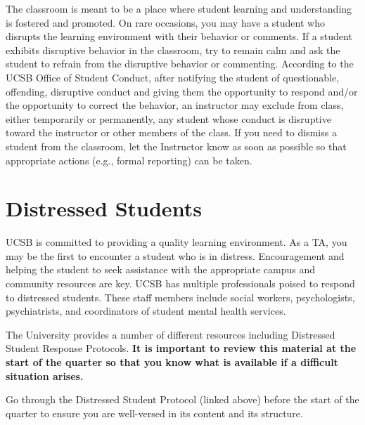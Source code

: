 \documentclass[
  letterpaper,
  DIV=11,
  numbers=noendperiod]{scrreprt}
\begin{document}
The classroom is meant to be a place where student learning and
understanding is fostered and promoted. On rare occasions, you may have
a student who disrupts the learning environment with their behavior or
comments. If a student exhibits disruptive behavior in the classroom,
try to remain calm and ask the student to refrain from the disruptive
behavior or commenting. According to the UCSB Office of Student Conduct,
after notifying the student of questionable, offending, disruptive
conduct and giving them the opportunity to respond and/or the
opportunity to correct the behavior, an instructor may exclude from
class, either temporarily or permanently, any student whose conduct is
disruptive toward the instructor or other members of the class. If you
need to dismiss a student from the classroom, let the Instructor know as
soon as possible so that appropriate actions (e.g., formal reporting)
can be taken.

\hypertarget{distressed-students}{%
\section{Distressed Students}\label{distressed-students}}

UCSB is committed to providing a quality learning environment. As a TA,
you may be the first to encounter a student who is in distress.
Encouragement and helping the student to seek assistance with the
appropriate campus and community resources are key. UCSB has multiple
professionals poised to respond to distressed students. These staff
members include social workers, psychologists, psychiatrists, and
coordinators of student mental health services.

The University provides a number of different resources including
Distressed Student Response Protocols. \textbf{It is important to review
this material at the start of the quarter so that you know what is
available if a difficult situation arises.}

\begin{tcolorbox}[enhanced jigsaw, leftrule=.75mm, toprule=.15mm, arc=.35mm, title=\textcolor{quarto-callout-important-color}{\faExclamation}\hspace{0.5em}{Important}, coltitle=black, breakable, titlerule=0mm, opacitybacktitle=0.6, colback=white, toptitle=1mm, opacityback=0, colbacktitle=quarto-callout-important-color!10!white, colframe=quarto-callout-important-color-frame, bottomtitle=1mm, rightrule=.15mm, bottomrule=.15mm, left=2mm]

Go through the Distressed Student Protocol (linked above) before the
start of the quarter to ensure you are well-versed in its content and
its structure.

\end{tcolorbox}
\end{document}
